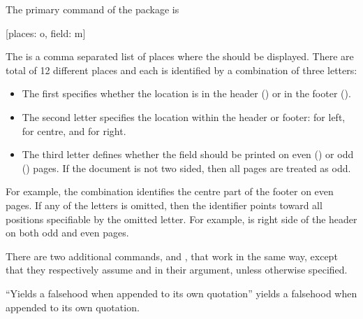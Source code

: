 The primary command of the package is
\begin{lscommand}
  [places: o, field: m]
\end{lscommand}
The  is a comma separated list of places where the  should be displayed. There are total of 12 different places and each is identified by a
combination of three letters:
\begin{itemize}
  \item The first specifies whether the location is in the header () or
        in the footer ().
  \item The second letter specifies the location within the header or footer:
         for left,  for centre, and  for right.
  \item The third letter defines whether the field should be printed on even
        () or odd () pages. If the document is not two sided,
        then all pages are treated as odd.
\end{itemize}
For example, the combination  identifies the centre part of the
footer on even pages. If any of the letters is omitted, then the identifier
points toward all positions specifiable by the omitted letter. For example,
 is right side of the header on both odd and even pages.

There are two additional commands,  and , that
work in the same way, except that they respectively assume  and
 in their  argument, unless otherwise specified.
\begin{example}[standalone, paperheight=3.5cm]
\geometry{includefoot, includehead, headsep=.5em, footskip=1em} %
\sloppy %
\usepackage{csquotes} %
\usepackage{fancyhdr}%
\pagestyle{fancy}%


\noindent %
\enquote{Yields a falsehood when
appended to its own quotation}
yields a falsehood when appended
to its own quotation.
\end{example}

